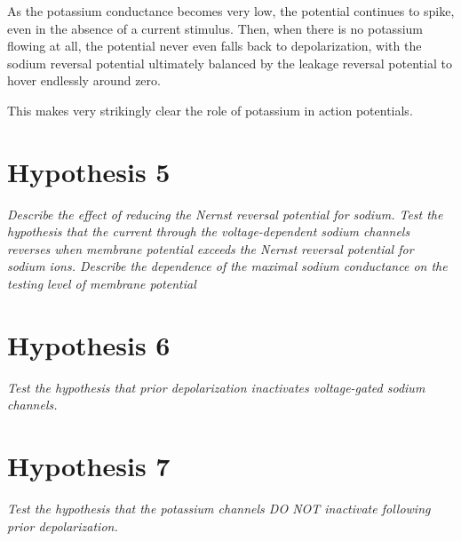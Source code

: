 \documentclass[12pt]{article}
\begin{document}
As the potassium conductance becomes very low, the potential continues to spike, even in the absence of a current stimulus.  Then, when there is no potassium flowing at all, the potential never even falls back to depolarization, with the sodium reversal potential ultimately balanced by the leakage reversal potential to hover endlessly around zero.  

This makes very strikingly clear the role of potassium in action potentials.

\section{Hypothesis 5}

\emph{Describe the effect of reducing the Nernst reversal potential for sodium.  Test the hypothesis that the current through the voltage-dependent sodium channels reverses when membrane potential exceeds the Nernst reversal potential for sodium ions.  Describe the dependence of the maximal sodium conductance on the testing level of membrane potential}

\section{Hypothesis 6}

\emph{Test the hypothesis that prior depolarization inactivates voltage-gated sodium channels.}

\section{Hypothesis 7}

\emph{Test the hypothesis that the potassium channels DO NOT inactivate following prior depolarization.}
\end{document}
